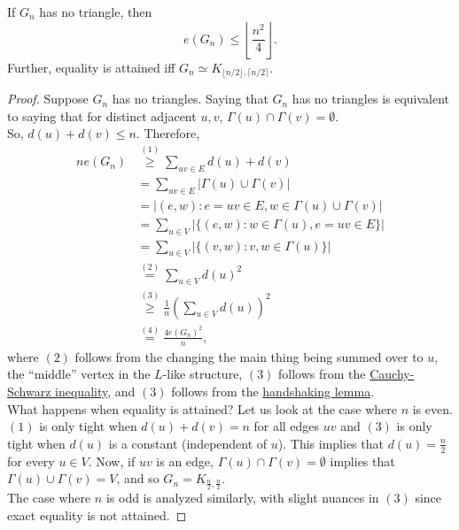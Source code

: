 		\begin{ftheo}
		\label{Mantel's Theorem}
			If $G_n$ has no triangle, then
			\[ e(G_n) \le \left\lfloor \frac{n^2}{4} \right\rfloor. \]
			Further, equality is attained iff $G_n \simeq K_{\lfloor n/2\rfloor , \lceil n/2 \rceil}$.
		\end{ftheo}
		\begin{proof}
			Suppose $G_n$ has no triangles. Saying that $G_n$ has no triangles is equivalent to saying that for distinct adjacent $u,v$, $\Gamma(u) \cap \Gamma(v) = \emptyset$.\\
			So, $d(u) + d(v) \le n$. Therefore,
			\begin{align*}
				ne(G_n) &\stackrel{(1)}{\ge} \sum_{uv \in E} d(u) + d(v) \\
					&= \sum_{uv \in E} |\Gamma(u) \cup \Gamma(v)| \\
					&= \left| (e, w) : e = uv \in E, w \in \Gamma(u) \cup \Gamma(v) \right| \\
					&= \sum_{u\in V} |\{ (e , w) : w \in \Gamma(u) , e = uv \in E \}| \\
					&= \sum_{u \in V} |\{ (v,w) : v,w \in \Gamma(u) \}| \\
					&\stackrel{(2)}{=} \sum_{u \in V} d(u)^2 \\
					&\stackrel{(3)}{\ge} \frac{1}{n} \left( \sum_{u \in V} d(u) \right)^2 \\
					&\stackrel{(4)}{=} \frac{4 e(G_n)^2}{n},
			\end{align*}
			where $(2)$ follows from the changing the main thing being summed over to $u$, the ``middle'' vertex in the $L$-like structure, $(3)$ follows from the \href{https://en.wikipedia.org/wiki/Cauchy-Schwarz_inequality}{Cauchy-Schwarz inequality}, and $(3)$ follows from the \href{https://en.wikipedia.org/wiki/Handshaking_lemma}{handshaking lemma}.\\

			What happens when equality is attained? Let us look at the case where $n$ is even.\\
			$(1)$ is only tight when $d(u) + d(v) = n$ for all edges $uv$ and $(3)$ is only tight when $d(u)$ is a constant (independent of $u$). This implies that $d(u) = \frac{n}{2}$ for every $u\in V$. Now, if $uv$ is an edge, $\Gamma(u) \cap \Gamma(v) = \emptyset$ implies that $\Gamma(u) \cup \Gamma(v) = V$, and so $G_n = K_{\frac{n}{2}, \frac{n}{2}}$.\\
			The case where $n$ is odd is analyzed similarly, with slight nuances in $(3)$ since exact equality is not attained.
		\end{proof}
		
